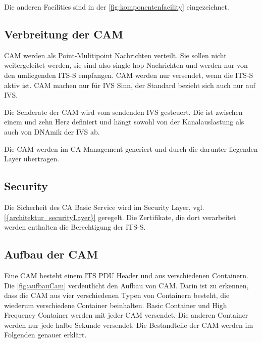 Die anderen Facilities sind in der \autoref{fig:komponentenfacility} eingezeichnet. 
\fi

\subsection{Verbreitung der CAM}
\ac{CAM} werden als Point-Mulitipoint Nachrichten verteilt. Sie sollen nicht weitergeleitet werden, sie sind also single hop Nachrichten und werden nur von den umliegenden \ac{ITS-S} empfangen. \ac{CAM} werden nur versendet, wenn die \ac{ITS-S} aktiv ist. \ac{CAM} machen nur für \ac{IVS} Sinn, der Standard \cite{en302637-2} bezieht sich auch nur auf \ac{IVS}. 

Die Senderate der \ac{CAM} wird vom sendenden \ac{IVS} gesteuert. Die ist zwischen einem und zehn Herz definiert und hängt sowohl von der Kanalauslastung als auch von DNAmik der \ac{IVS} ab. 

Die \ac{CAM} werden im \ac{CA} Management generiert und durch die darunter liegenden Layer übertragen.

\subsection{Security}
Die Sicherheit des \ac{CA} Basic Service wird im Security Layer, vgl. \autoref{{architektur_securityLayer}} geregelt. Die Zertifikate, die dort verarbeitet werden enthalten die Berechtigung der \ac{ITS-S}. 
 
\subsection{Aufbau der CAM}
Eine \ac{CAM} besteht einem \ac{ITS} \ac{PDU} Header und aus verschiedenen Containern. Die \autoref{fig:aufbauCam} verdeutlicht den Aufbau von \ac{CAM}. Darin ist zu erkennen, dass die \ac{CAM} aus vier verschiedenen Typen von Containern besteht, die wiederum verschiedene Container beinhalten. Basic Container und High Frequency Container werden mit jeder \ac{CAM} versendet. Die anderen Container werden nur jede halbe Sekunde versendet. Die Bestandteile der \ac{CAM} werden im Folgenden genauer erklärt.

